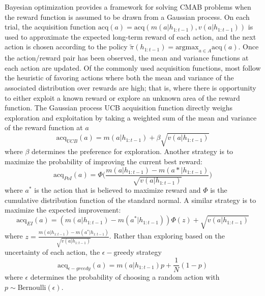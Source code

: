 \documentclass[10pt,letterpaper]{article}
\begin{document}
	Bayesian optimization \citep{Snoek} provides a framework for solving CMAB problems when the reward function is assumed to be drawn from a Gaussian process. On each trial, the acquisition function $\text{acq}(a) = \text{acq}(m(a|h_{1:t-1}), v(a|h_{1:t-1}))$ is used to approximate the expected long-term reward of each action, and the next action is chosen according to the policy $\tilde{\pi}(h_{1:t-1}) = \text{argmax}_{a \in A}\text{acq}(a)$. Once the action/reward pair has been observed, the mean and variance functions at each action are updated. Of the commonly used acquisition functions, most follow the heuristic of favoring actions where both the mean and variance of the associated distribution over rewards are high; that is, where there is opportunity to either exploit a known reward or explore an unknown area of the reward function. The Gaussian process UCB acquisition function directly weighs exploration and exploitation by taking a weighted sum of the mean and variance of the reward function at $a$ 
	\begin{equation}
	\text{acq}_{UCB}(a) = m(a|h_{1:t-1}) + \beta \sqrt{v(a|h_{1:t-1})}
	\end{equation}
	where $\beta$ determines the preference for exploration. Another strategy is to maximize the probability of improving the current best reward:
	\begin{equation}
	\text{acq}_{PoI}(a) = \Phi \bigg( \frac{m(a|h_{1:t-1}) -  m(a*|h_{1:t-1})}{\sqrt{v(a|h_{1:t-1})}} \bigg)
	\end{equation}
	where $a^{*}$ is the action that is believed to maximize reward and $\Phi$ is the cumulative distribution function of the standard normal. A similar strategy is to maximize the expected improvement:
	\begin{equation}
	\text{acq}_{EI}(a) = (m(a|h_{1:t-1}) -  m(a^{*}|h_{1:t-1})) \Phi(z) + \sqrt{v(a|h_{1:t-1})}
	\end{equation}
	where $z = \frac{m(a|h_{1:t-1}) -  m(a^{*}|h_{1:t-1})}{\sqrt{v(a|h_{1:t-1})}}$.
	Rather than exploring based on the uncertainty of each action, the $\epsilon - \text{greedy}$ strategy
	\begin{equation}
	\text{acq}_{\epsilon-greedy}(a) = m(a|h_{1:t-1})p + \frac{1}{N}(1-p)
	\end{equation}
	where $\epsilon$ determines the probability of choosing a random action with $p \sim \text{Bernoulli}(\epsilon)$.
	
\end{document}
